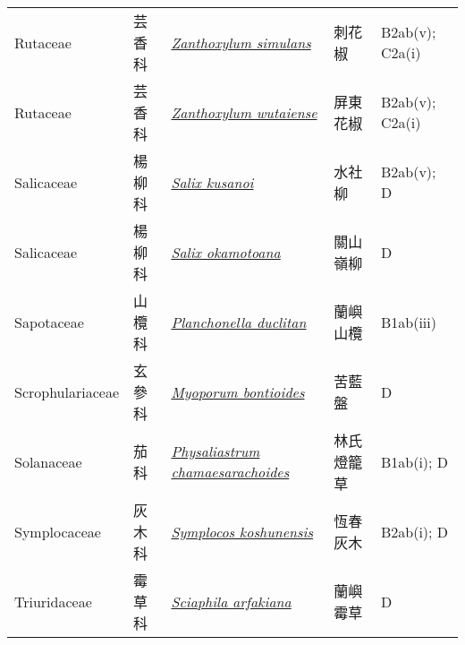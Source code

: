 {\begin{longtable}{L{2.5cm}L{2cm}L{5cm}L{2.5cm}L{3cm}}
    Rutaceae & 芸香科 & \href{http://www.theplantlist.org/tpl1.1/search?q=Zanthoxylum+simulans}{\textit{Zanthoxylum simulans} } & 刺花椒 & B2ab(v); C2a(i)    \\
    Rutaceae & 芸香科 & \href{http://www.theplantlist.org/tpl1.1/search?q=Zanthoxylum+wutaiense}{\textit{Zanthoxylum wutaiense} } & 屏東花椒 & B2ab(v); C2a(i)    \\
    Salicaceae & 楊柳科 & \href{http://www.theplantlist.org/tpl1.1/search?q=Salix+kusanoi}{\textit{Salix kusanoi} } & 水社柳 & B2ab(v); D    \\
    Salicaceae & 楊柳科 & \href{http://www.theplantlist.org/tpl1.1/search?q=Salix+okamotoana}{\textit{Salix okamotoana} } & 關山嶺柳 & D    \\
    Sapotaceae & 山欖科 & \href{http://www.theplantlist.org/tpl1.1/search?q=Planchonella+duclitan}{\textit{Planchonella duclitan} } & 蘭嶼山欖 & B1ab(iii)    \\
    Scrophulariaceae & 玄參科 & \href{http://www.theplantlist.org/tpl1.1/search?q=Myoporum+bontioides}{\textit{Myoporum bontioides} } & 苦藍盤 & D    \\
    Solanaceae & 茄科 & \href{http://www.theplantlist.org/tpl1.1/search?q=Physaliastrum+chamaesarachoides}{\textit{Physaliastrum chamaesarachoides} } & 林氏燈籠草 & B1ab(i); D    \\
    Symplocaceae & 灰木科 & \href{http://www.theplantlist.org/tpl1.1/search?q=Symplocos+koshunensis}{\textit{Symplocos koshunensis} } & 恆春灰木 & B2ab(i); D    \\
    Triuridaceae & 霉草科 & \href{http://www.theplantlist.org/tpl1.1/search?q=Sciaphila+arfakiana}{\textit{Sciaphila arfakiana} } & 蘭嶼霉草 & D    \\

\end{longtable}}
